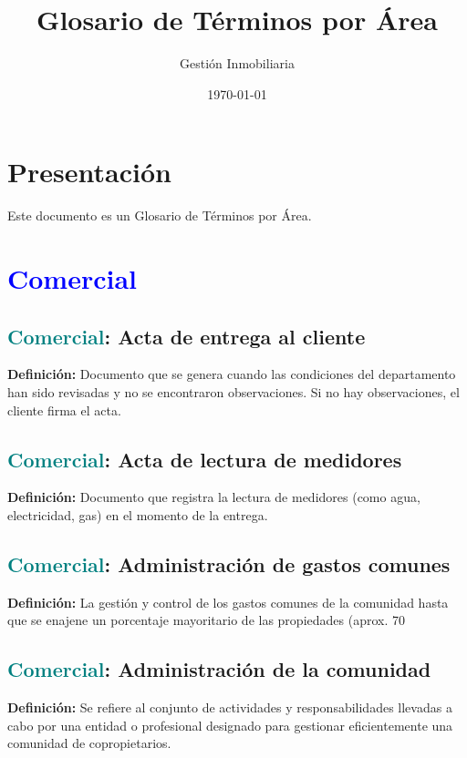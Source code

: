 \documentclass[12pt]{article}
\title{\textbf{Glosario de Términos por Área}}
\author{Gestión Inmobiliaria}
\date{\today}
\begin{document}
\maketitle
\tableofcontents
\section*{Presentación}
Este documento es un Glosario de Términos por Área.
\newpage
\section{\textcolor{blue}{Comercial}}
\subsection{\textcolor{teal}{Comercial}: Acta de entrega al cliente}
\textbf{Definición:} Documento que se genera cuando las condiciones del departamento han sido revisadas y no se encontraron observaciones. Si no hay observaciones, el cliente firma el acta.
\subsection{\textcolor{teal}{Comercial}: Acta de lectura de medidores}
\textbf{Definición:} Documento que registra la lectura de medidores (como agua, electricidad, gas) en el momento de la entrega.
\subsection{\textcolor{teal}{Comercial}: Administración de gastos comunes}
\textbf{Definición:} La gestión y control de los gastos comunes de la comunidad hasta que se enajene un porcentaje mayoritario de las propiedades (aprox. 70%
\subsection{\textcolor{teal}{Comercial}: Administración de la comunidad}
\textbf{Definición:} Se refiere al conjunto de actividades y responsabilidades llevadas a cabo por una entidad o profesional designado para gestionar eficientemente una comunidad de copropietarios. 
\end{document}
